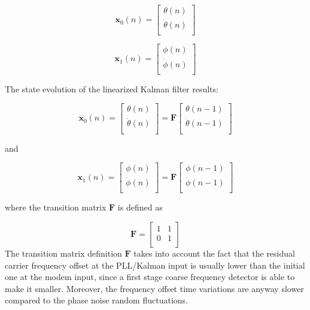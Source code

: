 \begin{equation}
\mathbf{x}_0(n)=\left[\begin{array}{c}
\theta(n)\\
\dot{\theta}(n)\\
\end{array}\right]
\label{eq_xx}
\end{equation}

\begin{equation}
\mathbf{x}_1(n)=\left[\begin{array}{c}
\phi(n)\\
\dot{\phi}(n)\\
\end{array}\right]
\label{eq_xx2}
\end{equation}

The state evolution of the linearized Kalman filter results:

\begin{equation}
\mathbf{x}_0(n)=\left[\begin{array}{c}
\theta(n)\\
\dot{\theta}(n)\\
\end{array}\right]=\mathbf{F}\left[\begin{array}{c}
\theta(n-1)\\
\dot{\theta}(n-1)\\
\end{array}\right]
\label{eq_xh}
\end{equation}

and

\begin{equation}
\mathbf{x}_1(n)=\left[\begin{array}{c}
\phi(n)\\
\dot{\phi}(n)\\
\end{array}\right]=\mathbf{F}\left[\begin{array}{c}
\phi(n-1)\\
\dot{\phi}(n-1)\\
\end{array}\right]
\label{eq_xv}
\end{equation}

where the transition matrix $\mathbf{F}$ is defined as

\begin{equation}
\mathbf{F}=\left[\begin{matrix}
1 & 1  \\
0 & 1  \\
\end{matrix}\right]
\label{eq_F2}
\end{equation}
The transition matrix definition $\mathbf{F}$ takes into account the fact that the residual carrier frequency offset at the PLL/Kalman input is usually lower than the initial one at the modem input, since a first stage coarse frequency detector is able to make it smaller. Moreover, the frequency offset time variations are anyway slower compared to the phase noise random fluctuations. 


